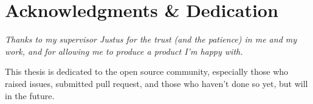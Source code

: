 
\begingroup
  \let\clearpage\relax
  \let\cleardoublepage\relax
  \chapter*{Acknowledgments \& Dedication}

  \itshape
  Thanks to my supervisor Justus for the trust (and the patience) in me and my work, and for allowing me to produce a product I'm happy with.

  \medskip
  \noindent
  This thesis is dedicated to the open source community, especially those who raised issues, submitted pull request, and those who haven't done so yet, but will in the future.
\endgroup
